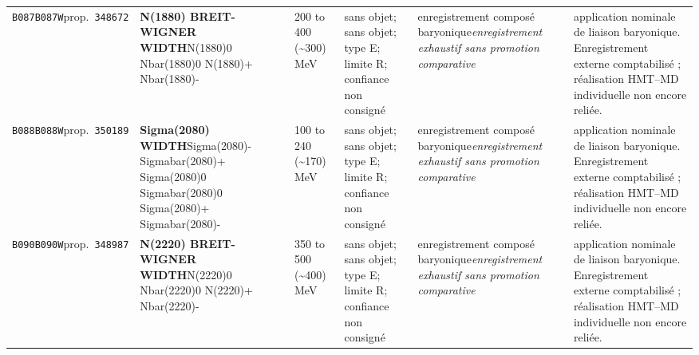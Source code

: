 \begin{landscape}
\begin{longtable}{L{1.85cm}L{4.45cm}L{2.35cm}L{4.05cm}L{3.35cm}L{7.15cm}}
\texttt{B087}\newline \texttt{B087W}\newline prop.\ \texttt{348672} & \textbf{N(1880) BREIT-WIGNER WIDTH}\newline N(1880)0 \textbar{}\allowbreak{} Nbar(1880)0 \textbar{}\allowbreak{} N(1880)+ \textbar{}\allowbreak{} Nbar(1880)- & 200 to 400 (\textasciitilde{}300)\,MeV & sans objet; sans objet; type E; limite R; confiance non consigné & enregistrement composé baryonique\newline \emph{enregistrement exhaustif sans promotion comparative} & application nominale de liaison baryonique. Enregistrement externe comptabilisé ; réalisation HMT--MD individuelle non encore reliée. \\
\texttt{B088}\newline \texttt{B088W}\newline prop.\ \texttt{350189} & \textbf{Sigma(2080) WIDTH}\newline Sigma(2080)- \textbar{}\allowbreak{} Sigmabar(2080)+ \textbar{}\allowbreak{} Sigma(2080)0 \textbar{}\allowbreak{} Sigmabar(2080)0 \textbar{}\allowbreak{} Sigma(2080)+ \textbar{}\allowbreak{} Sigmabar(2080)- & 100 to 240 (\textasciitilde{}170)\,MeV & sans objet; sans objet; type E; limite R; confiance non consigné & enregistrement composé baryonique\newline \emph{enregistrement exhaustif sans promotion comparative} & application nominale de liaison baryonique. Enregistrement externe comptabilisé ; réalisation HMT--MD individuelle non encore reliée. \\
\texttt{B090}\newline \texttt{B090W}\newline prop.\ \texttt{348987} & \textbf{N(2220) BREIT-WIGNER WIDTH}\newline N(2220)0 \textbar{}\allowbreak{} Nbar(2220)0 \textbar{}\allowbreak{} N(2220)+ \textbar{}\allowbreak{} Nbar(2220)- & 350 to 500 (\textasciitilde{}400)\,MeV & sans objet; sans objet; type E; limite R; confiance non consigné & enregistrement composé baryonique\newline \emph{enregistrement exhaustif sans promotion comparative} & application nominale de liaison baryonique. Enregistrement externe comptabilisé ; réalisation HMT--MD individuelle non encore reliée. \\

\end{longtable}
\end{landscape}
